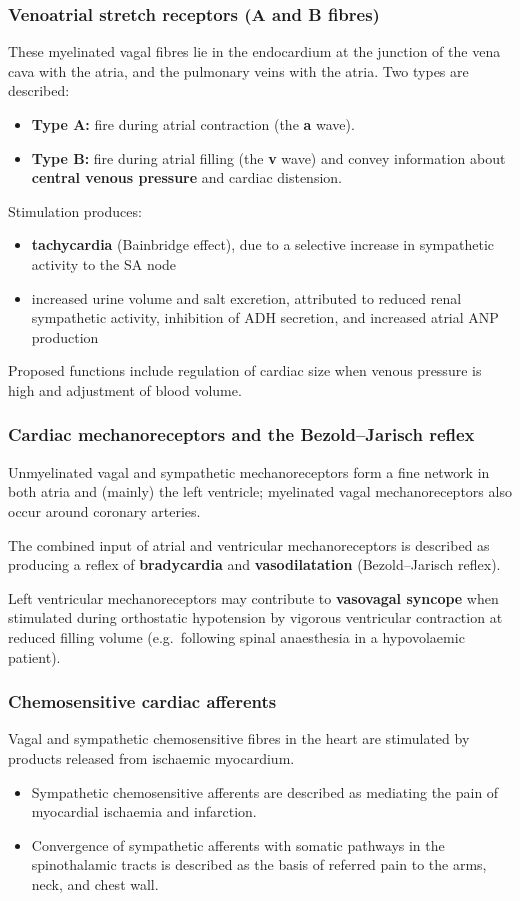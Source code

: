 \documentclass[11pt,a4paper]{article}
\begin{document}
\subsubsection{Venoatrial stretch receptors (A and B fibres)}
These myelinated vagal fibres lie in the endocardium at the junction of the vena cava with the atria, and the pulmonary veins with the atria. Two types are described:
\begin{itemize}
\item \textbf{Type A:} fire during atrial contraction (the \textbf{a} wave).
\item \textbf{Type B:} fire during atrial filling (the \textbf{v} wave) and convey information about \textbf{central venous pressure} and cardiac distension.
\end{itemize}
Stimulation produces:
\begin{itemize}
\item \textbf{tachycardia} (Bainbridge effect), due to a selective increase in sympathetic activity to the SA node
\item increased urine volume and salt excretion, attributed to reduced renal sympathetic activity, inhibition of ADH secretion, and increased atrial ANP production
\end{itemize}
Proposed functions include regulation of cardiac size when venous pressure is high and adjustment of blood volume.

\subsubsection{Cardiac mechanoreceptors and the Bezold--Jarisch reflex}
Unmyelinated vagal and sympathetic mechanoreceptors form a fine network in both atria and (mainly) the left ventricle; myelinated vagal mechanoreceptors also occur around coronary arteries.

The combined input of atrial and ventricular mechanoreceptors is described as producing a reflex of \textbf{bradycardia} and \textbf{vasodilatation} (Bezold--Jarisch reflex).

Left ventricular mechanoreceptors may contribute to \textbf{vasovagal syncope} when stimulated during orthostatic hypotension by vigorous ventricular contraction at reduced filling volume (e.g.\ following spinal anaesthesia in a hypovolaemic patient).

\subsubsection{Chemosensitive cardiac afferents}
Vagal and sympathetic chemosensitive fibres in the heart are stimulated by products released from ischaemic myocardium.
\begin{itemize}
\item Sympathetic chemosensitive afferents are described as mediating the pain of myocardial ischaemia and infarction.
\item Convergence of sympathetic afferents with somatic pathways in the spinothalamic tracts is described as the basis of referred pain to the arms, neck, and chest wall.
\end{itemize}
\end{document}
